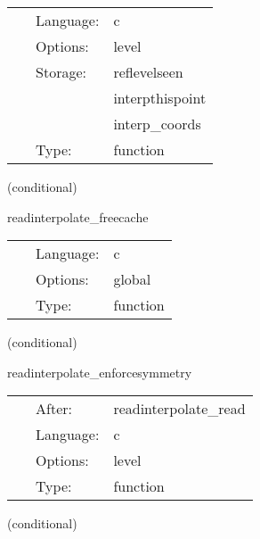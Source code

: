  \begin{tabular*}{160mm}{cll} 
~ & Language:  & c \\ 
~ & Options:  & level \\ 
~ & Storage:  & reflevelseen \\ 
~& ~ &interpthispoint\\ 
~& ~ &interp\_coords\\ 
~ & Type:  & function \\ 
\end{tabular*} 


\vspace{5mm}

   (conditional) 

\hspace{5mm} readinterpolate\_freecache 

\hspace{5mm}{\it free memory used for dataset caches } 


\hspace{5mm}

 \begin{tabular*}{160mm}{cll} 
~ & Language:  & c \\ 
~ & Options:  & global \\ 
~ & Type:  & function \\ 
\end{tabular*} 


\vspace{5mm}

   (conditional) 

\hspace{5mm} readinterpolate\_enforcesymmetry 

\hspace{5mm}{\it enforce symmeries if desired } 


\hspace{5mm}

 \begin{tabular*}{160mm}{cll} 
~ & After:  & readinterpolate\_read \\ 
~ & Language:  & c \\ 
~ & Options:  & level \\ 
~ & Type:  & function \\ 
\end{tabular*} 


\vspace{5mm}

   (conditional) 

